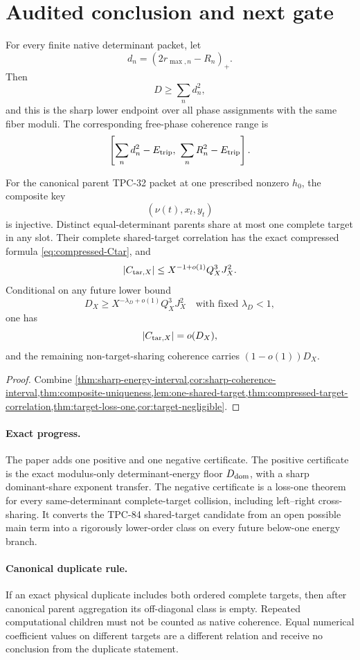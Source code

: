 \section{Audited conclusion and next gate}
\label{sec:claim-boundary}

\begin{theorem}
\label{thm:audited-conclusion}
For every finite native determinant packet, let
\[
 d_n=(2r_{\max,n}-R_n)_+.
\]
Then
\[
 D\ge\sum_nd_n^2,
\]
and this is the sharp lower endpoint over all phase assignments with
the same fiber moduli.  The corresponding free-phase coherence range
is
\[
 \left[
 \sum_nd_n^2-E_{\rm trip},\
 \sum_nR_n^2-E_{\rm trip}
 \right].
\]

For the canonical parent TPC-32 packet at one prescribed nonzero
\(h_0\), the composite key
\[
 (\nu(t),x_t,y_t)
\]
is injective.  Distinct equal-determinant parents share at most one
complete target in any slot.  Their complete shared-target
correlation has the exact compressed formula
\eqref{eq:compressed-Ctar}, and
\[
 |C_{\mathrm{tar},X}|
 \le
 X^{-1+o(1)}Q_X^3J_X^2.
\]
Conditional on any future lower bound
\[
 D_X\ge
 X^{-\lambda_D+o(1)}Q_X^3J_X^2
 \quad\text{with fixed }\lambda_D<1,
\]
one has
\[
 |C_{\mathrm{tar},X}|=o(D_X),
\]
and the remaining non-target-sharing coherence carries
\((1-o(1))D_X\).
\end{theorem}

\begin{proof}
Combine
\cref{thm:sharp-energy-interval,cor:sharp-coherence-interval,thm:composite-uniqueness,lem:one-shared-target,thm:compressed-target-correlation,thm:target-loss-one,cor:target-negligible}.
\end{proof}

\paragraph{Exact progress.}
The paper adds one positive and one negative certificate.  The
positive certificate is the exact modulus-only determinant-energy
floor \(D_{\mathrm{dom}}\), with a sharp dominant-share exponent transfer.
The negative certificate is a loss-one theorem for every
same-determinant complete-target collision, including left--right
cross-sharing.  It converts the TPC-84 shared-target candidate from an
open possible main term into a rigorously lower-order class on every
future below-one energy branch.

\paragraph{Canonical duplicate rule.}
If an exact physical duplicate includes both ordered complete targets,
then after canonical parent aggregation its off-diagonal class is
empty.  Repeated computational children must not be counted as native
coherence.  Equal numerical coefficient values on different targets
are a different relation and receive no conclusion from the duplicate
statement.

